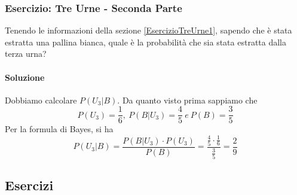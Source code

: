 \documentclass{report}
\begin{document}
\subsubsection{Esercizio: Tre Urne - Seconda Parte}
Tenendo le informazioni della sezione \ref{EsercizioTreUrne1}, sapendo che è stata estratta una pallina bianca, quale è la probabilità che sia stata estratta dalla terza urna?
\paragraph{Soluzione} Dobbiamo calcolare \(P(U_3|B)\). Da quanto visto prima sappiamo che \[P(U_3) = \frac{1}{6},\ P(B|U_3) = \frac{4}{5}\ e\ P(B) = \frac{3}{5}\] Per la formula di Bayes, si ha \[P(U_3|B) = \frac{P(B|U_3)\cdot P(U_3)}{P(B)} = \frac{\frac{4}{5}\cdot \frac{1}{6}}{\frac{3}{5}} = \frac{2}{9}\]
\subsection{Esercizi}
\end{document}
